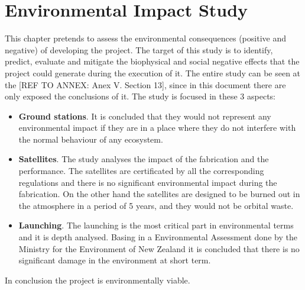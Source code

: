 \chapter{Environmental Impact Study}
This chapter pretends to assess the environmental consequences (positive and negative) of developing the project. The target of this study is to identify, predict, evaluate and mitigate the biophysical and social negative effects that the project could generate during the execution of it. The entire study can be seen at the [{REF TO ANNEX: Anex V. Section 13}], since in this document there are only exposed the conclusions of it.
The study is focused in these 3 aspects:

\begin{itemize}
\item \textbf{Ground stations}. It is concluded that they would not represent any environmental impact if they are in a place where they do not interfere with the normal behaviour of any ecosystem.
\item \textbf{Satellites}. The study analyses the impact of the fabrication and the performance. The satellites are certificated by all the corresponding regulations and there is no significant environmental impact during the fabrication. On the other hand the satellites are designed to be burned out in the atmosphere in a period of 5 years, and they would not be orbital waste.
\item \textbf{Launching}. The launching is the most critical part in environmental terms and it is depth analysed. Basing in a Environmental Assessment done by the Ministry for the Environment of New Zealand \cite{EIS} it is concluded that there is no significant damage in the environment at short term.
\end{itemize}

In conclusion the project is environmentally viable.
